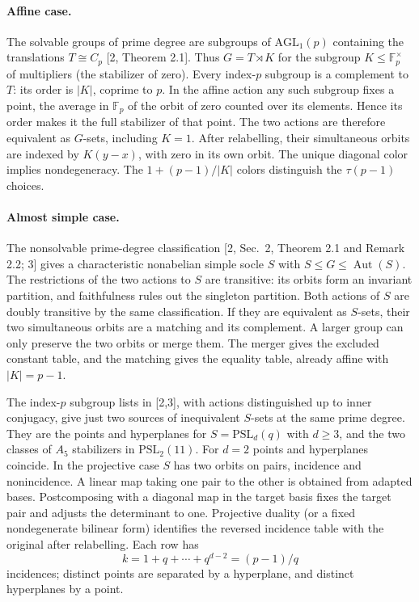\documentclass[11pt]{article}
\begin{document}
\paragraph{Affine case.} The solvable groups of prime degree are subgroups of $\mathrm{AGL}_1(p)$ containing the translations $T\cong C_p$ [2, Theorem 2.1]. Thus $G=T\rtimes K$ for the subgroup $K\le\mathbb F_p^\times$ of multipliers (the stabilizer of zero). Every index-$p$ subgroup is a complement to $T$: its order is $|K|$, coprime to $p$. In the affine action any such subgroup fixes a point, the average in $\mathbb F_p$ of the orbit of zero counted over its elements. Hence its order makes it the full stabilizer of that point. The two actions are therefore equivalent as $G$-sets, including $K=1$. After relabelling, their simultaneous orbits are indexed by $K(y-x)$, with zero in its own orbit. The unique diagonal color implies nondegeneracy. The $1+(p-1)/|K|$ colors distinguish the $\tau(p-1)$ choices.

\paragraph{Almost simple case.} The nonsolvable prime-degree classification [2, Sec.~2, Theorem 2.1 and Remark 2.2; 3] gives a characteristic nonabelian simple socle $S$ with $S\le G\le\operatorname{Aut}(S)$. The restrictions of the two actions to $S$ are transitive: its orbits form an invariant partition, and faithfulness rules out the singleton partition. Both actions of $S$ are doubly transitive by the same classification. If they are equivalent as $S$-sets, their two simultaneous orbits are a matching and its complement. A larger group can only preserve the two orbits or merge them. The merger gives the excluded constant table, and the matching gives the equality table, already affine with $|K|=p-1$.

The index-$p$ subgroup lists in [2,3], with actions distinguished up to inner conjugacy, give just two sources of inequivalent $S$-sets at the same prime degree. They are the points and hyperplanes for $S=\mathrm{PSL}_d(q)$ with $d\ge3$, and the two classes of $A_5$ stabilizers in $\mathrm{PSL}_2(11)$. For $d=2$ points and hyperplanes coincide. In the projective case $S$ has two orbits on pairs, incidence and nonincidence. A linear map taking one pair to the other is obtained from adapted bases. Postcomposing with a diagonal map in the target basis fixes the target pair and adjusts the determinant to one. Projective duality (or a fixed nondegenerate bilinear form) identifies the reversed incidence table with the original after relabelling. Each row has
\[
 k=1+q+\cdots+q^{d-2}=(p-1)/q
\]
incidences; distinct points are separated by a hyperplane, and distinct hyperplanes by a point.
\end{document}
